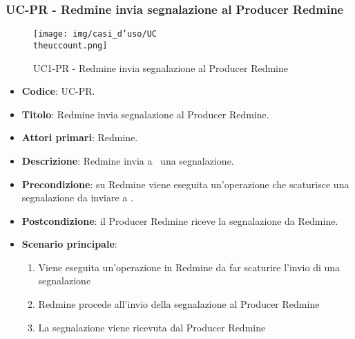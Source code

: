\subsubsection{UC\theuccount-PR - Redmine invia segnalazione al Producer Redmine}
    \begin{figure}[H]
		\centering
		\texttt{[image: img/casi\_d'uso/UC\\theuccount.png]}\\
		\caption{UC1-PR - Redmine invia segnalazione al Producer Redmine}
	\end{figure}
\begin{itemize}
	\item \textbf{Codice}: UC\theuccount-PR.
	\item \textbf{Titolo}: Redmine invia segnalazione al Producer Redmine.
	\item \textbf{Attori primari}: Redmine.
	\item \textbf{Descrizione}: Redmine invia a \progetto\ una segnalazione.
	\item \textbf{Precondizione}: su Redmine viene eseguita un'operazione che scaturisce una
	segnalazione da inviare a \progetto.
	\item \textbf{Postcondizione}: il Producer Redmine riceve la segnalazione da Redmine.
	\item \textbf{Scenario principale}:
	\begin{enumerate}
		\item Viene eseguita un'operazione in Redmine da far scaturire l'invio di una segnalazione
		\item Redmine procede all'invio della segnalazione al Producer Redmine
        \item La segnalazione viene ricevuta dal Producer Redmine
	\end{enumerate}

\end{itemize}


